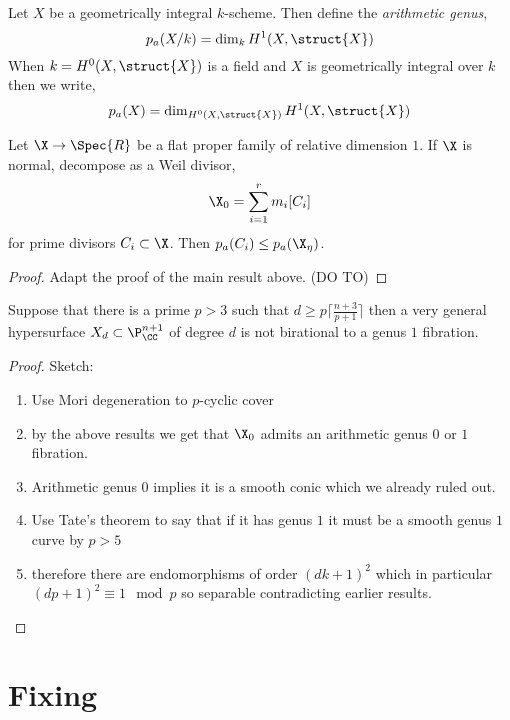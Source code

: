 \documentclass[12pt]{article}
\begin{document}
\begin{defn}
Let $X$ be a geometrically integral $k$-scheme. Then define the \textit{arithmetic genus},
\[ p_a(X/k) = \dim_{k} H^1(X, \struct{X}) \]
When $k = H^0(X, \struct{X})$ is a field and $X$ is geometrically integral over $k$ then we write,
\[ p_a(X) = \dim_{H^0(X, \struct{X})} H^1(X, \struct{X}) \]
\end{defn}

\begin{prop}
Let $\X \to \Spec{R}$ be a flat proper family of relative dimension $1$. If $\X$ is normal, decompose as a Weil divisor,
\[ \X_0 = \sum_{i = 1}^r m_i [C_i] \]
for prime divisors $C_i \subset \X$. Then $p_a(C_i) \le p_a(\X_\eta)$.
\end{prop}

\begin{proof}
Adapt the proof of the main result above. (DO TO)
\end{proof}


\begin{theorem}
Suppose that there is a prime $p > 3$ such that $d \ge p \lceil \frac{n+3}{p+1} \rceil$ then a very general hypersurface $X_d \subset \P_{\CC}^{n+1}$ of degree $d$ is not birational to a genus $1$ fibration.
\end{theorem}

\begin{proof}
Sketch:
\begin{enumerate}
\item Use Mori degeneration to $p$-cyclic cover
\item by the above results we get that $\X_0$ admits an arithmetic genus $0$ or $1$ fibration. 

\item Arithmetic genus $0$ implies it is a smooth conic which we already ruled out. 

\item Use Tate's theorem to say that if it has genus $1$ it must be a smooth genus $1$ curve by $p > 5$

\item therefore there are endomorphisms of order $(dk + 1)^2$ which in particular $(dp + 1)^2 \equiv 1 \mod p$ so separable contradicting earlier results. 
\end{enumerate}
\end{proof}

\section{Fixing}
\end{document}
